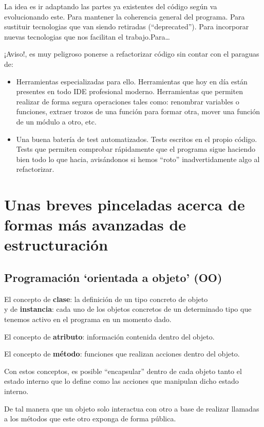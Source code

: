\documentclass[spanish,12pt,a4paper,final,oneside]{book}
\begin{document}
La idea es ir adaptando las partes ya existentes del código según va evolucionando este. Para mantener la coherencia general del programa. Para sustituir tecnologias que van siendo retiradas (``deprecated''). Para incorporar nuevas tecnologias que nos facilitan el trabajo.Para\ldots

\vspace{1cm}
¡Aviso!, es muy peligroso ponerse a refactorizar código sin contar con el paraguas de:
\begin{itemize}
\item Herramientas especializadas para ello. Herramientas que hoy en día están presentes en todo IDE profesional moderno. Herramientas que permiten realizar de forma segura operaciones tales como: renombrar variables o funciones, extraer trozos de una función para formar otra, mover una función de un módulo a otro, etc.
\item Una buena batería de test automatizados. Tests escritos en el propio código. Tests que permiten comprobar rápidamente que el programa sigue haciendo bien todo lo que hacia, avisándonos si hemos ``roto'' inadvertidamente algo al refactorizar.
\end{itemize}


\section{Unas breves pinceladas acerca de formas más avanzadas de estructuración}

\subsection{Programación `orientada a objeto' (OO)}
El concepto de \textbf{clase}: la definición de un tipo concreto de objeto
\\ y de \textbf{instancia}: cada uno de los objetos concretos de un determinado tipo que tenemos activo en el programa en un momento dado.

El concepto de \textbf{atributo}: información contenida dentro del objeto.

El concepto de \textbf{método}: funciones que realizan acciones dentro del objeto.

Con estos conceptos, es posible ``encapsular'' dentro de cada objeto tanto el estado interno que lo define como las acciones que manipulan dicho estado interno.

De tal manera que un objeto solo interactua con otro a base de realizar llamadas a los métodos que este otro exponga de forma pública.
\end{document}
